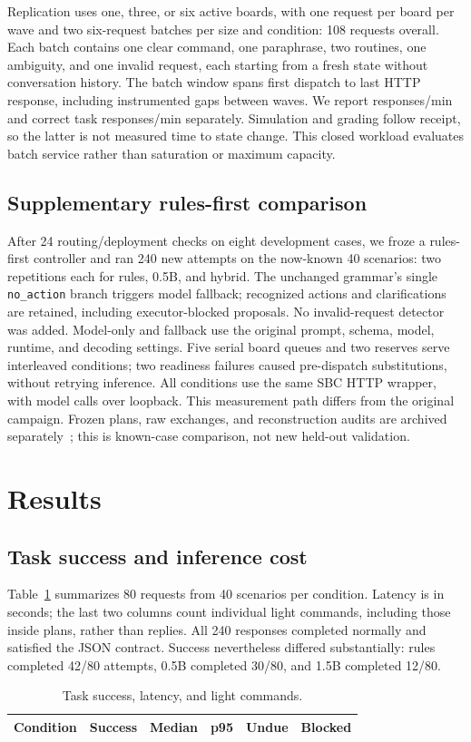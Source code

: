\documentclass[letterpaper,conference]{IEEEtran}
\providecommand{\StudyPrefix}{}
\begin{document}
Replication uses one, three, or six active boards, with one request per board per wave and two six-request batches per size and condition: 108 requests overall. Each batch contains one clear command, one paraphrase, two routines, one ambiguity, and one invalid request, each starting from a fresh state without conversation history. The batch window spans first dispatch to last HTTP response, including instrumented gaps between waves. We report responses/min and correct task responses/min separately. Simulation and grading follow receipt, so the latter is not measured time to state change. This closed workload evaluates batch service rather than saturation or maximum capacity.

\subsection{Supplementary rules-first comparison}
After 24 routing/deployment checks on eight development cases, we froze a rules-first controller and ran 240 new attempts on the now-known 40 scenarios: two repetitions each for rules, 0.5B, and hybrid. The unchanged grammar's single \texttt{no\_action} branch triggers model fallback; recognized actions and clarifications are retained, including executor-blocked proposals. No invalid-request detector was added. Model-only and fallback use the original prompt, schema, model, runtime, and decoding settings. Five serial board queues and two reserves serve interleaved conditions; two readiness failures caused pre-dispatch substitutions, without retrying inference. All conditions use the same SBC HTTP wrapper, with model calls over loopback. This measurement path differs from the original campaign. Frozen plans, raw exchanges, and reconstruction audits are archived separately~\cite{hybridartifact}; this is known-case comparison, not new held-out validation.

\section{Results}
\subsection{Task success and inference cost}
Table~\ref{tab:quality} summarizes 80 requests from 40 scenarios per condition. Latency is in seconds; the last two columns count individual light commands, including those inside plans, rather than replies. All 240 responses completed normally and satisfied the JSON contract. Success nevertheless differed substantially: rules completed 42/80 attempts, 0.5B completed 30/80, and 1.5B completed 12/80.
\begin{table}[t]\caption{Task success, latency, and light commands.}
\centering\footnotesize\setlength{\tabcolsep}{4pt}\begin{tabular}{lrrrrr}\toprule
Condition & Success & Median & p95 & Undue & Blocked\\\midrule

\end{tabular}\label{tab:quality}\end{table}
\end{document}
